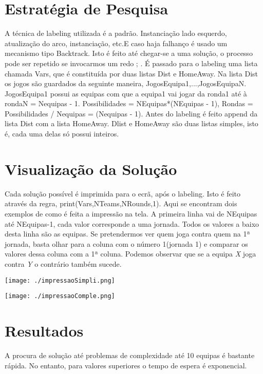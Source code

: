 \documentclass[runningheads,a4paper]{llncs}
\begin{document}
\section{Estratégia de Pesquisa}
A técnica de labeling utilizada é a padrão. Instanciação lado esquerdo, atualização do arco, instanciação, etc.E caso haja falhanço é usado um mecanismo tipo Backtrack. Isto é feito até chegar-se a uma solução, o processo pode ser repetido se invocarmos um redo ; . É passado para o labeling uma lista chamada Vars, que é constituída por duas listas Dist e HomeAway. Na lista Dist os jogos são guardados da seguinte maneira, \lbrack JogosEquipa1,...,JogosEquipaN\rbrack. JogosEquipa1 possui as equipas com que a equipa1 vai jogar da ronda1 até à rondaN = Nequipas - 1. Possibilidades = NEquipas*(NEquipas - 1), Rondas = Possibilidades / Nequipas = (Nequipas - 1). Antes do labeling é feito append da lista Dist com a lista HomeAway. Dlist e HomeAway são duas listas simples, isto é, cada uma delas só possui inteiros.

\section{Visualização da Solução}
Cada solução possível é imprimida para o ecrã, após o labeling. Isto é feito através da regra, print(Vars,NTeams,NRounds,1). Aqui se encontram dois exemplos de como é feita a impressão na tela. A primeira linha vai de NEquipas até NEquipas-1, cada valor corresponde a uma jornada. Todos os valores a baixo desta linha são as equipas. Se pretendermos ver quem joga contra quem na 1ª jornada, basta olhar para a coluna com o número 1(jornada 1) e comparar os valores dessa coluna com a 1ª coluna. Podemos observar que se a equipa \textit{X} joga contra \textit{Y} o contrário também sucede.

\begin{center}
\texttt{[image: ./impressaoSimpli.png]}
\end{center}

\begin{center}
\texttt{[image: ./impressaoComple.png]}
\end{center}

\section{Resultados}
A procura de solução até problemas de complexidade até 10 equipas é bastante rápida. No entanto, para valores superiores o tempo de espera é exponencial.
\end{document}

